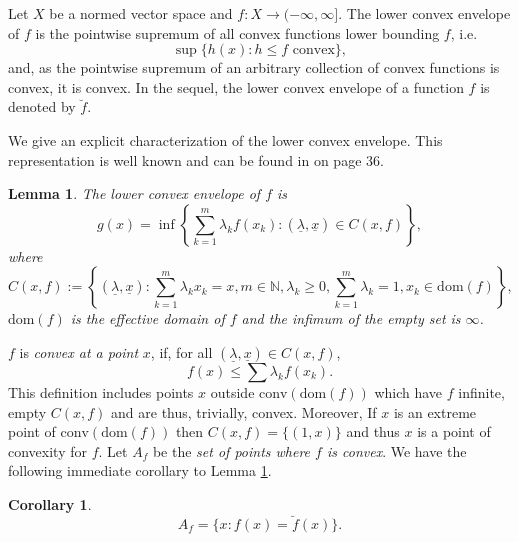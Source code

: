 \documentclass[12pt]{article}
\newtheorem{lemma}[theorem]{Lemma}
\newtheorem{corollary}[theorem]{Corollary}
\begin{document}
Let $X$ be a normed vector space and $f : X \rightarrow (-\infty,\infty]$.
The lower convex envelope of $f$ is the pointwise supremum of all convex functions lower bounding $f$, i.e.
\begin{equation*}
\sup \{ h(x) : h \le f \text{ convex} \},
\end{equation*}
and, as the pointwise supremum of an arbitrary collection of convex functions is convex, it is convex.
In the sequel, the lower convex envelope of a function $f$ is denoted by $\breve{f}$.

We give an explicit characterization of the lower convex envelope.
This representation is well known and can be found in \cite{Rockafellar1970} on page 36.

\begin{lemma}
\label{lemma_lower_convex_envelope}
The lower convex envelope of $f$ is
\begin{equation*}
g(x) = \inf \left \{ \sum_{k=1}^{m} \lambda_{k} f(x_{k}) : (\underline{\lambda},\underline{x}) \in C(x,f) \right\},
\end{equation*}
where 
\begin{equation*}
C(x,f)
:= \left\{ (\underline{\lambda},\underline{x}) : \sum_{k=1}^{m} \lambda_{k} x_{k} = x, m \in \mathbb{N}, \lambda_{k} \ge 0, \sum_{k=1}^{m} \lambda_{k} \! = \! 1, x_{k} \in \mathrm{dom}(f) \right\},
\end{equation*}
$\mathrm{dom}(f)$ is the effective domain of $f$ and the infimum of the empty set is $\infty$.
\end{lemma}

$f$ is \emph{convex at a point} $x$, if, for all $(\underline{\lambda},\underline{x}) \in C(x,f)$,
\begin{equation*}
f(x) \le \sum \lambda_{k} f(x_{k}).
\end{equation*}
This definition includes points $x$ outside $\mathrm{conv}(\mathrm{dom}(f))$ which have $f$ infinite, empty $C(x,f)$ and are thus, trivially, convex.
Moreover, If $x$ is an extreme point of $\mathrm{conv}(\mathrm{dom}(f))$ then $C(x,f) = \{(1,x)\}$ and thus $x$ is a point of convexity for $f$.
Let $A_{f}$ be the \emph{set of points where $f$ is convex}.
We have the following immediate corollary to Lemma \ref{lemma_lower_convex_envelope}.

\begin{corollary}
\label{corollary_lce_points}
\begin{equation*}
A_{f} = \{ x : f(x) = \breve{f}(x) \}.
\end{equation*}
\end{corollary}
\end{document}
